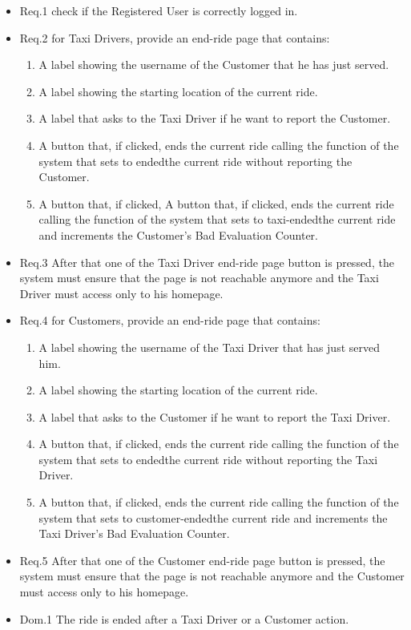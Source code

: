 \documentclass{report}
\begin{document}
				\begin{itemize}
					\item \lbrack Req.1\rbrack \label{sec:fr1_g7} check if the Registered User is correctly logged in.
					\item \lbrack Req.2\rbrack \label{sec:fr2_g7} for Taxi Drivers, provide an end-ride page that contains:
						\begin{enumerate}
							\item A label showing the username of the Customer that he has just served.
							\item A label showing the starting location of the current ride.
							\item A label that asks to the Taxi Driver if he want to report the Customer.
							\item A button that, if clicked, ends the current ride calling the function of the system that sets to \textquotedbleft ended\textquotedbright the current ride without reporting the Customer.
							\item A button that, if clicked, A button that, if clicked, ends the current ride calling the function of the system that sets to \textquotedbleft taxi-ended\textquotedbright the current ride and increments the Customer's Bad Evaluation Counter.
						\end{enumerate}
					\item \lbrack Req.3\rbrack \label{sec:fr3_g7} After that one of the Taxi Driver end-ride page button is pressed, the system must ensure that the page is not reachable anymore and the Taxi Driver must access only to his homepage.
					\\
					\item \lbrack Req.4\rbrack \label{sec:fr4_g7} for Customers, provide an end-ride page that contains:
						\begin{enumerate}
							\item A label showing the username of the Taxi Driver that has just served him.
							\item A label showing the starting location of the current ride.
							\item A label that asks to the Customer if he want to report the Taxi Driver.
							\item A button that, if clicked, ends the current ride calling the function of the system that sets to \textquotedbleft ended\textquotedbright the current ride without reporting the Taxi Driver.
							\item A button that, if clicked, ends the current ride calling the function of the system that sets to \textquotedbleft customer-ended\textquotedbright the current ride and increments the Taxi Driver's Bad Evaluation Counter.
						\end{enumerate}
					\item \lbrack Req.5\rbrack \label{sec:fr5_g7} After that one of the Customer end-ride page button is pressed, the system must ensure that the page is not reachable anymore and the Customer must access only to his homepage.
					\item \lbrack Dom.1\rbrack \label{sec:da1_g7} The ride is ended after a Taxi Driver or a Customer action.
				\end{itemize}
\end{document}
